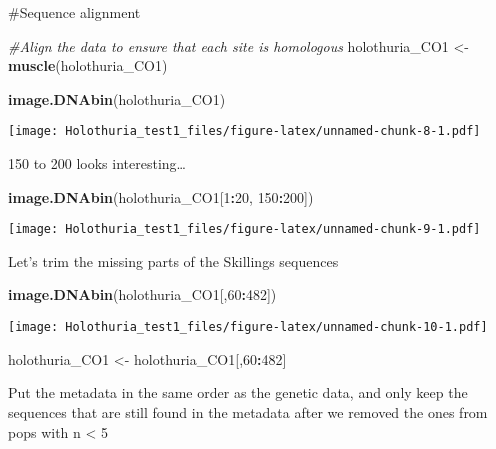 \documentclass[
]{article}
\newenvironment{Shaded}{\begin{snugshade}}{\end{snugshade}}
\newcommand{\CommentTok}[1]{\textcolor[rgb]{0.56,0.35,0.01}{\textit{#1}}}
\newcommand{\DecValTok}[1]{\textcolor[rgb]{0.00,0.00,0.81}{#1}}
\newcommand{\KeywordTok}[1]{\textcolor[rgb]{0.13,0.29,0.53}{\textbf{#1}}}
\newcommand{\NormalTok}[1]{#1}
\newcommand{\OperatorTok}[1]{\textcolor[rgb]{0.81,0.36,0.00}{\textbf{#1}}}
\newcommand{\StringTok}[1]{\textcolor[rgb]{0.31,0.60,0.02}{#1}}
\begin{document}
\#Sequence alignment

\begin{Shaded}
\begin{Highlighting}[]
\CommentTok{#Align the data to ensure that each site is homologous}
\NormalTok{holothuria_CO1 <-}\StringTok{ }\KeywordTok{muscle}\NormalTok{(holothuria_CO1)}

\KeywordTok{image.DNAbin}\NormalTok{(holothuria_CO1)}
\end{Highlighting}
\end{Shaded}

\texttt{[image: Holothuria\_test1\_files/figure-latex/unnamed-chunk-8-1.pdf]}

150 to 200 looks interesting\ldots{}

\begin{Shaded}
\begin{Highlighting}[]
\KeywordTok{image.DNAbin}\NormalTok{(holothuria_CO1[}\DecValTok{1}\OperatorTok{:}\DecValTok{20}\NormalTok{, }\DecValTok{150}\OperatorTok{:}\DecValTok{200}\NormalTok{])}
\end{Highlighting}
\end{Shaded}

\texttt{[image: Holothuria\_test1\_files/figure-latex/unnamed-chunk-9-1.pdf]}

Let's trim the missing parts of the Skillings sequences

\begin{Shaded}
\begin{Highlighting}[]
\KeywordTok{image.DNAbin}\NormalTok{(holothuria_CO1[,}\DecValTok{60}\OperatorTok{:}\DecValTok{482}\NormalTok{])}
\end{Highlighting}
\end{Shaded}

\texttt{[image: Holothuria\_test1\_files/figure-latex/unnamed-chunk-10-1.pdf]}

\begin{Shaded}
\begin{Highlighting}[]
\NormalTok{holothuria_CO1 <-}\StringTok{ }\NormalTok{holothuria_CO1[,}\DecValTok{60}\OperatorTok{:}\DecValTok{482}\NormalTok{]}
\end{Highlighting}
\end{Shaded}

Put the metadata in the same order as the genetic data, and only keep
the sequences that are still found in the metadata after we removed the
ones from pops with n \textless{} 5

\begin{Shaded}
\end{Shaded}
\end{document}
